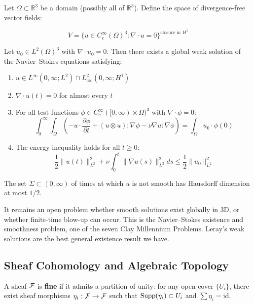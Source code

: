 Let $\Omega \subset \mathbb{R}^3$ be a domain (possibly all of $\mathbb{R}^3$). Define the space of divergence-free vector fields:

\[
V = \{u \in C_c^\infty(\Omega)^3 : \nabla \cdot u = 0\}^{\text{closure in } H^1}
\]

\begin{theorem}[Leray, 1934]
Let $u_0 \in L^2(\Omega)^3$ with $\nabla \cdot u_0 = 0$. Then there exists a global weak solution of the Navier--Stokes equations satisfying:
\begin{enumerate}
\item $u \in L^\infty(0,\infty; L^2) \cap L^2_{\text{loc}}(0,\infty; H^1)$
\item $\nabla \cdot u(t) = 0$ for almost every $t$
\item For all test functions $\phi \in C_c^\infty([0,\infty) \times \Omega)^3$ with $\nabla \cdot \phi = 0$:
\[
\int_0^\infty \int_\Omega \left( -u \cdot \frac{\partial \phi}{\partial t} + (u \otimes u) : \nabla \phi - \nu \nabla u : \nabla \phi \right) = \int_\Omega u_0 \cdot \phi(0)
\]
\item The energy inequality holds for all $t \geq 0$:
\[
\frac{1}{2}\|u(t)\|_{L^2}^2 + \nu \int_0^t \|\nabla u(s)\|_{L^2}^2 ds \leq \frac{1}{2}\|u_0\|_{L^2}^2
\]
\end{enumerate}
\end{theorem}

\begin{theorem}
The set $\Sigma \subset (0,\infty)$ of times at which $u$ is not smooth has Hausdorff dimension at most $1/2$.
\end{theorem}

\begin{remark}
It remains an open problem whether smooth solutions exist globally in 3D, or whether finite-time blow-up can occur. This is the Navier--Stokes existence and smoothness problem, one of the seven Clay Millennium Problems. Leray's weak solutions are the best general existence result we have.
\end{remark}

\subsection{Sheaf Cohomology and Algebraic Topology}

\begin{definition}
A sheaf $\mathcal{F}$ is \textbf{fine} if it admits a partition of unity: for any open cover $\{U_i\}$, there exist sheaf morphisms $\eta_i: \mathcal{F} \to \mathcal{F}$ such that $\operatorname{Supp}(\eta_i) \subset U_i$ and $\sum \eta_i = \text{id}$.
\end{definition}

